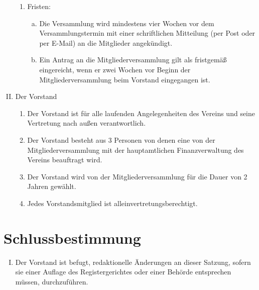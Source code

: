 \documentclass[12pt,a4paper,titlepage]{scrartcl}
\begin{document}
\begin{enumerate}[I.]
\begin{enumerate}[1.]
	\item Fristen:
		\begin{enumerate}[a)]
		\item Die Versammlung wird mindestens vier Wochen vor dem 
		Versammlungstermin mit einer schriftlichen Mitteilung (per Post oder per E-Mail) an die Mitglieder 
		angekündigt.
		\item Ein Antrag an die Mitgliederversammlung gilt als fristgemäß eingereicht, wenn 
		er zwei Wochen vor Beginn der Mitgliederversammlung beim Vorstand 
		eingegangen ist.
		\end{enumerate}
	\end{enumerate}
\item Der Vorstand
	\begin{enumerate}[1.]
	\item Der Vorstand ist für alle laufenden Angelegenheiten des Vereins und seine 			Vertretung nach außen verantwortlich.
	\item Der Vorstand besteht aus 3 Personen von denen eine von der Mitgliederversammlung mit der hauptamtlichen Finanzverwaltung des Vereins beauftragt wird.
	\item Der Vorstand wird von der Mitgliederversammlung für die Dauer von 2 Jahren gewählt.
	\item Jedes Vorstandsmitglied ist alleinvertretungsberechtigt.
	\end{enumerate}
\end{enumerate}


\section{Schlussbestimmung}
\begin{enumerate}[I.]
\item Der Vorstand ist befugt, redaktionelle Änderungen an dieser Satzung, sofern sie 
einer Auflage des Registergerichtes oder einer Behörde entsprechen müssen, 
durchzuführen.
\end{enumerate}
\end{document}

